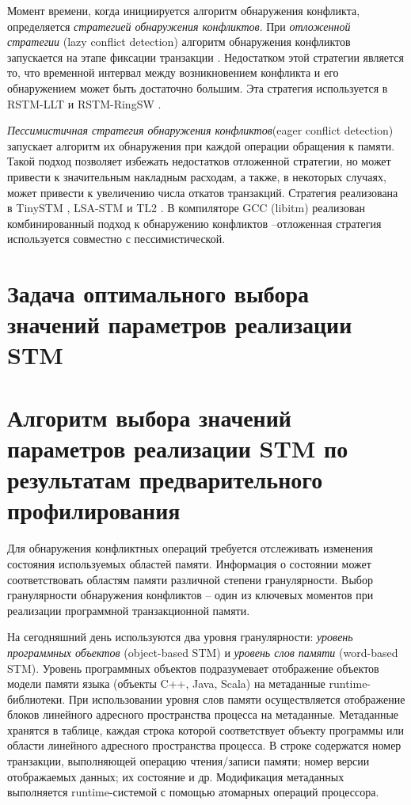 Момент времени, когда инициируется алгоритм обнаружения конфликта, определяется \textit{стратегией обнаружения конфликтов}. При \textit{отложенной стратегии} (lazy conflict detection) алгоритм обнаружения конфликтов запускается на этапе фиксации транзакции \cite{spear_ringstm}. Недостатком этой стратегии является то, что временной интервал между возникновением конфликта и его обнаружением может быть достаточно большим. Эта стратегия используется в RSTM-LLT \cite{rstm_proj} и RSTM-RingSW \cite{rstm_proj, spear_strategy_for_cm, spear_ringstm}. 

\textit{Пессимистичная стратегия обнаружения конфликтов}(eager conflict detection) запускает алгоритм их обнаружения при каждой операции обращения к памяти. Такой подход позволяет избежать недостатков отложенной стратегии, но может привести к значительным накладным расходам, а также, в некоторых случаях, может привести к увеличению числа откатов транзакций. Стратегия реализована в TinySTM \cite{felber_fetzer_marlier_riegel}, LSA-STM \cite{riegel_felber_fetzer} и TL2 \cite{dice_shavit_tl2}. В компиляторе GCC (libitm) реализован комбинированный подход к обнаружению конфликтов --отложенная стратегия используется совместно с пессимистической.

\section{Задача оптимального выбора значений параметров реализации STM}
\section{Алгоритм выбора значений параметров реализации STM по результатам
  предварительного профилирования}

Для обнаружения конфликтных операций требуется отслеживать изменения состояния используемых областей памяти. Информация о состоянии может соответствовать областям памяти различной степени гранулярности. Выбор гранулярности обнаружения конфликтов -- один из ключевых моментов при реализации программной транзакционной памяти.

На сегодняшний день используются два уровня гранулярности: \textit{уровень программных объектов} (object-based STM) и \textit{уровень слов памяти} (word-based STM). Уровень программных объектов подразумевает отображение объектов модели памяти языка (объекты C++, Java, Scala) на метаданные runtime-библиотеки. При использовании уровня слов памяти осуществляется отображение блоков линейного адресного пространства процесса на метаданные. Метаданные хранятся в таблице, каждая строка которой соответствует объекту программы или области линейного адресного пространства процесса. В строке содержатся номер транзакции, выполняющей операцию чтения/записи памяти; номер версии отображаемых данных; их состояние и др. Модификация метаданных выполняется runtime-системой с помощью атомарных операций процессора.

